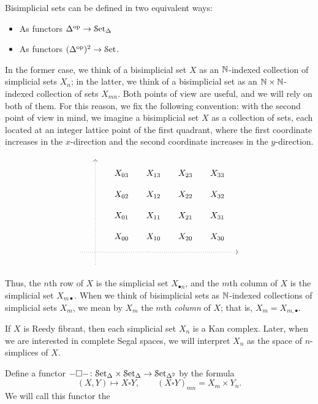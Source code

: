 \documentclass[main.tex]{subfiles}
\begin{document}
Bisimplicial sets can be defined in two equivalent ways:
\begin{itemize}
  \item As functors $\Delta^{\mathrm{op}} \to \mathcal{S}\mathrm{et}_{\Delta}$

  \item As functors $(\Delta^{\mathrm{op}})^{2} \to \mathcal{S}\mathrm{et}$.
\end{itemize}
In the former case, we think of a bisimplicial set $X$ as an $\mathbb{N}$-indexed collection of simplicial sets $X_{n}$; in the latter, we think of a bisimplicial set as an $\mathbb{N} \times \mathbb{N}$-indexed collection of sets $X_{mn}$. Both points of view are useful, and we will rely on both of them. For this reason, we fix the following convention: with the second point of view in mind, we imagine a bisimplicial set $X$ as a collection of sets, each located at an integer lattice point of the first quadrant, where the first coordinate increases in the $x$-direction and the second coordinate increases in the $y$-direction. 
\begin{equation*}
  \begin{tikzcd}[row sep=small, column sep=small]
    & \
    \arrow[dddddd, leftarrow, dotted, at start]
    \\
    && X_{03}
    & X_{13}
    & X_{23}
    & X_{33}
    \\
    && X_{02}
    & X_{12}
    & X_{22}
    & X_{32}
    \\
    && X_{01}
    & X_{11}
    & X_{21}
    & X_{31}
    \\
    && X_{00}
    & X_{10}
    & X_{20}
    & X_{30}
    \\
    \
    \arrow[rrrrrr, dotted, at end]
    &&&&&& \
    \\
    & \
  \end{tikzcd}
\end{equation*}
Thus, the $n$th row of $X$ is the simplicial set $X_{\bullet n}$, and the $m$th column of $X$ is the simplicial set $X_{m \bullet}$. When we think of bisimplicial sets as $\mathbb{N}$-indexed collections of simplicial sets $X_{m}$, we mean by $X_{m}$ the $m$th \emph{column} of $X$; that is, $X_{m} = X_{m, \bullet}$.

If $X$ is Reedy fibrant, then each simplicial set $X_{n}$ is a Kan complex. Later, when we are interested in complete Segal spaces, we will interpret $X_{n}$ as the space of $n$-simplices of $X$.

\begin{definition}
  Define a functor $- \square -\colon \mathcal{S}\mathrm{et}_{\Delta} \times \mathcal{S}\mathrm{et}_{\Delta} \to \mathcal{S}\mathrm{et}_{\Delta^{2}}$ by the formula
  \begin{equation*}
    (X, Y) \mapsto X \square Y,\qquad (X \square Y)_{mn} = X_{m} \times Y_{n}.
  \end{equation*}
  We will call this functor the \defn{box product.}
\end{definition}
\end{document}
